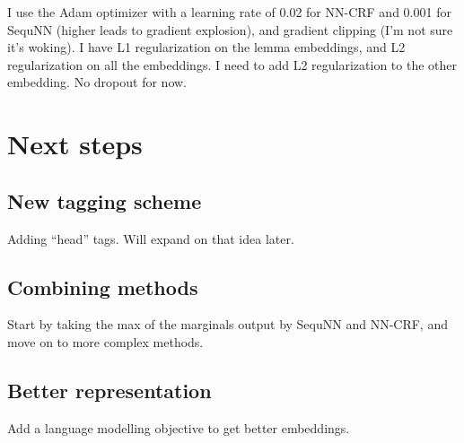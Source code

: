 \documentclass[10pt,a4paper]{article}
\begin{document}
I use the Adam optimizer with a learning rate of 0.02 for NN-CRF and 0.001 for SequNN (higher leads to gradient explosion), and gradient clipping (I'm not sure it's woking). I have L1 regularization on the lemma embeddings, and L2 regularization on all the embeddings. I need to add L2 regularization to the other embedding. No dropout for now.

\section{Next steps}

\subsection{New tagging scheme}

Adding ``head'' tags. Will expand on that idea later.

\subsection{Combining methods}

Start by taking the max of the marginals output by SequNN and NN-CRF, and move on to more complex methods.

\subsection{Better representation}

Add a language modelling objective to get better embeddings.
\end{document}
